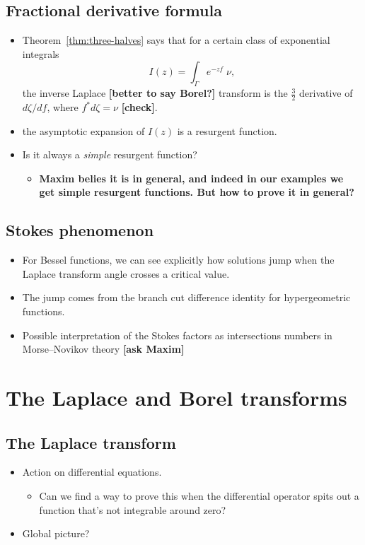 \documentclass{article}
\begin{document}
\subsection{Fractional derivative formula}
\begin{itemize}
\item Theorem~\ref{thm:three-halves} says that for a certain class of exponential integrals
\[ I(z) = \int_\Gamma e^{-zf}\;\nu, \]
the inverse Laplace \textbf{[better to say Borel?]} transform is the $\tfrac{3}{2}$ derivative of $d\zeta/df$, where $f^* d\zeta = \nu$ \textbf{[check]}.
\item the asymptotic expansion of $I(z)$ is a resurgent function.
\item Is it always a \emph{simple} resurgent function?
\begin{itemize}
\item \textbf{Maxim belies it is in general, and indeed in our examples we get simple resurgent functions. But how to prove it in general?}
\end{itemize} 
\end{itemize}
\subsection{Stokes phenomenon}
\begin{itemize}
\item For Bessel functions, we can see explicitly how solutions jump when the Laplace transform angle crosses a critical value.
\item The jump comes from the branch cut difference identity for hypergeometric functions.
\item Possible interpretation of the Stokes factors as intersections numbers in Morse--Novikov theory \textbf{[ask Maxim]}
\end{itemize}
\section{The Laplace and Borel transforms}
\subsection{The Laplace transform}
\begin{itemize}
\item Action on differential equations.
\begin{itemize}
\item Can we find a way to prove this when the differential operator spits out a function that's not integrable around zero?
\end{itemize}
\item Global picture?
\end{itemize}
\end{document}
